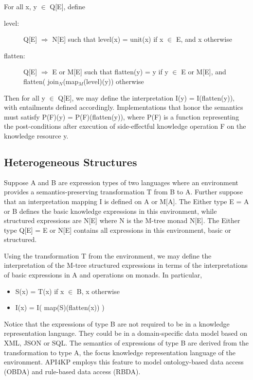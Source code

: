 \documentclass[runningheads]{llncs}
\begin{document}
For all x, y $\in$ Q[E], define
\begin{description}
\item[level:] Q[E] $\Rightarrow$ N[E]
such that level(x) = unit(x) if x $\in$ E, and x otherwise
\item[flatten:] Q[E] $\Rightarrow$ E or M[E]  
such that flatten(y) = y if y $\in$  E or M[E], and flatten( join$_N$(map$_M$(level)(y)) otherwise
\end{description}
Then for all y $\in$ Q[E], we may define the interpretation I(y) = I(flatten(y)), with entailments defined accordingly. %
Implementations that honor the semantics must satisfy P(F)(y) = P(F)(flatten(y)), where P(F) is a function representing the post-conditions after execution of side-effectful knowledge operation F on the knowledge resource y.


\vspace{-0.3cm}
\subsection{Heterogeneous Structures}
Suppose A and B are expression types of two languages where an environment provides a semantics-preserving transformation T from B to A.
Further suppose that an interpretation mapping I is defined on A or M[A].
The Either type E = A or B defines the basic knowledge expressions in this environment, while structured expressions are N[E] where N is the M-tree monad  N[E].
The Either type Q[E] = E or N[E] contains all expressions in this environment, basic or structured. 

Using the transformation T from the environment, we may define the interpretation of the M-tree structured expressions in terms of the interpretations of basic expressions in A and operations on monads. In particular,
\begin{itemize}
\item S(x) = T(x) if x $\in$ B, x otherwise
\item I(x) = I( map(S)(flatten(x)) )
\end{itemize}
Notice that the expressions of type B are not required to be in a knowledge representation language. They could be in a domain-specific data model based on XML, JSON or SQL. The semantics of expressions of type B are derived from the transformation to type A, the focus  knowledge representation language of the environment. API4KP employs this feature to model ontology-based data access (OBDA) and rule-based data access (RBDA).
\end{document}
